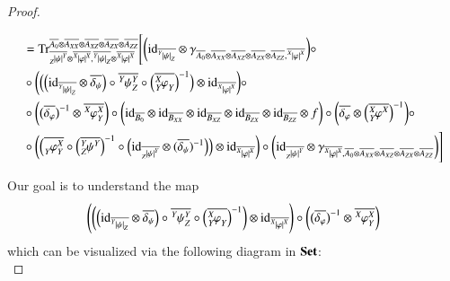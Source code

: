\documentclass{amsart}
\def\tn{\textnormal}
\def\Trace{\tn{Tr}}
\def\ol{\overline}
\def\id{\tn{id}}
\def\Set{{\bf Set}}
\newcommand{\feeddd}[3]{{\tensor*[^{#2}_{\color{white}{!}}]{{|#1|}}{^{#3}}}}%
\newcommand{\feeddc}[3]{{\tensor*[^{#2}]{{|#1|}}{_{#3}}}}
\newcommand{\feedcd}[3]{{\tensor*[_{#2}]{{|#1|}}{^{#3}}}}
\newcommand{\feedda}[3]{{\tensor*[^{#2}_{\color{white}{!}}]{{#1}}{^{#2}_{#3}}}}
\newcommand{\feedca}[3]{{\tensor*[_{#2}]{{#1}}{_{#2}^{#3}}}}
\newcommand{\feedad}[3]{{\tensor*[^{#2}_{#3}]{{#1}}{^{#2}}}}
\newcommand{\feedac}[3]{{\tensor*[_{#2}^{#3}]{{#1}}{_{#2}}}}
\theoremstyle{remark}
\theoremstyle{definition}
\begin{document}
\begin{proof}
\begin{align*}
\end{align*}
\begin{align*}
&=\Trace^{\ol{A_0}\otimes\ol{A_{XX}}\otimes\ol{A_{XZ}}\otimes\ol{A_{ZX}}\otimes\ol{A_{ZZ}}}_{\ol{\feedcd{\psi}{Z}{Y}}\otimes\ol{\feeddd{\varphi}{X}{X}},\ol{\feeddc{\psi}{Y}{Z}}\otimes\ol{\feeddd{\varphi}{X}{X}}}\Bigg[
\bigg(\id_{\ol{\feeddc{\psi}{Y}{Z}}}\otimes\gamma_{\ol{A_0}\otimes\ol{A_{XX}}\otimes\ol{A_{XZ}}\otimes\ol{A_{ZX}}\otimes\ol{A_{ZZ}},\ol{\feeddd{\varphi}{X}{X}}}\bigg)\circ\\
&\circ\bigg(\Big(\Big(\id_{\ol{\feeddc{\psi}{Y}{Z}}}\otimes\ol{\delta_\psi}\Big)\circ\ol{\feedda{\psi}{Y}{Z}}\circ\Big(\ol{\feedac{\varphi}{Y}{X}}\Big)^{-1}\Big)\otimes\id_{\ol{\feeddd{\varphi}{X}{X}}}\bigg)\circ\\
&\circ\bigg(\big(\ol{\delta_\varphi}\big)^{-1}\otimes\ol{\feedda{\varphi}{X}{Y}}\bigg)\circ\bigg(\id_{\ol{B_0}}\otimes\id_{\ol{B_{XX}}}\otimes\id_{\ol{B_{XZ}}}\otimes\id_{\ol{B_{ZX}}}\otimes\id_{\ol{B_{ZZ}}}\otimes f\bigg)\circ\bigg(\ol{\delta_\varphi}\otimes\Big(\ol{\feedad{\varphi}{X}{Y}}\Big)^{-1}\bigg)\circ\\
&\circ\bigg(\Big(\ol{\feedca{\varphi}{Y}{X}}\circ\Big(\ol{\feedad{\psi}{Y}{Z}}\Big)^{-1}\circ\Big(\id_{\ol{\feedcd{\psi}{Z}{Y}}}\otimes(\ol{\delta_\psi})^{-1}\Big)\Big)\otimes\id_{\ol{\feeddd{\varphi}{X}{X}}}\bigg)\circ\bigg(\id_{\ol{\feedcd{\psi}{Z}{Y}}}\otimes\gamma_{\ol{\feeddd{\varphi}{X}{X}},\ol{A_0}\otimes\ol{A_{XX}}\otimes\ol{A_{XZ}}\otimes\ol{A_{ZX}}\otimes\ol{A_{ZZ}}}\bigg)\Bigg]
\end{align*}

Our goal is to understand the map
\[\Bigg(\bigg(\Big(\id_{\ol{\feeddc{\psi}{Y}{Z}}}\otimes\ol{\delta_\psi}\Big)\circ\ol{\feedda{\psi}{Y}{Z}}\circ\Big(\ol{\feedac{\varphi}{Y}{X}}\Big)^{-1}\bigg)\otimes\id_{\ol{\feeddd{\varphi}{X}{X}}}\Bigg)\circ\bigg(\big(\ol{\delta_\varphi}\big)^{-1}\otimes\ol{\feedda{\varphi}{X}{Y}}\bigg)\]
which can be visualized via the following diagram in $\Set$:\\


\end{proof}
\end{document}
